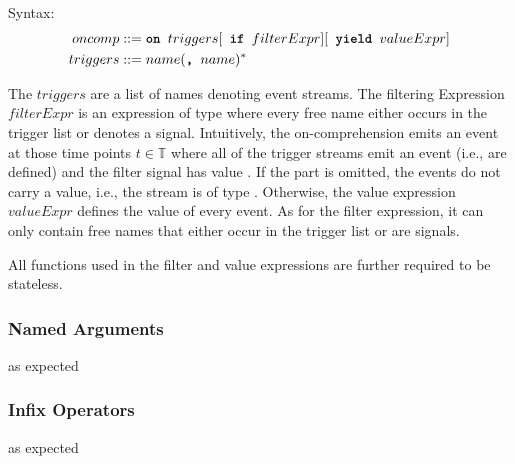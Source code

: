 Syntax:
\begin{align*}
  oncomp   &::= \texttt{\textbf{on }} triggers [\texttt{\textbf{ if }} filterExpr] [\texttt{\textbf{ yield }} valueExpr] \\
  triggers &::= name(\texttt{\textbf{, }} name)^*
\end{align*}

The $triggers$ are a list of names denoting event streams. 
The filtering Expression $filterExpr$ is an expression of type  where every free name either occurs in the trigger list or denotes a signal. 
Intuitively, the on-comprehension emits an event at those time points $t∈𝕋$ where all of the trigger streams emit an event (i.e., are defined) and the filter signal has value .
If the  part is omitted, the events do not carry a value, i.e., the stream is of type . 
Otherwise, the value expression $valueExpr$ defines the value of every event. 
As for the filter expression, it can only contain free names that either occur in the trigger list or are signals.

All functions used in the filter and value expressions are further required to be stateless.

\subsubsection{Named Arguments}

as expected

\subsubsection{Infix Operators}

as expected

